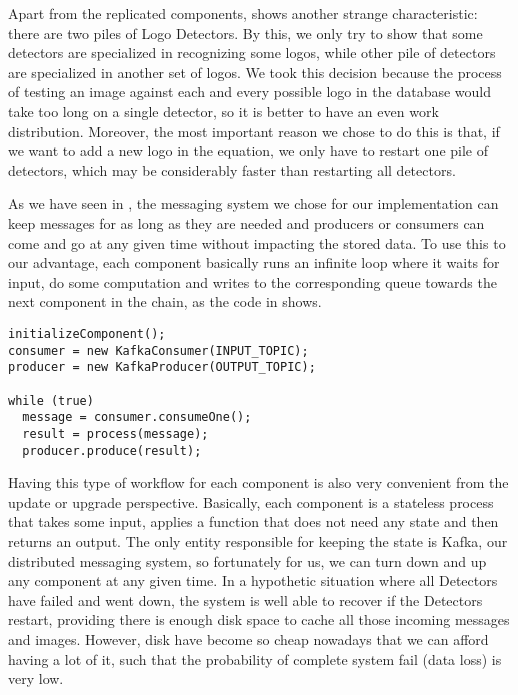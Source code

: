 Apart from the replicated components, 
shows another strange characteristic: there are two piles of Logo Detectors.
By this, we only try to show that some detectors are specialized in recognizing
some logos, while other pile of detectors are specialized in another set of
logos. We took this decision because the process of testing an image against
each and every possible logo in the database would take too long on a single
detector, so it is better to have an even work distribution. Moreover, the most
important reason we chose to do this is that, if we want to add a new logo in
the equation, we only have to restart one pile of detectors, which may be
considerably faster than restarting all detectors.

As we have seen in , the messaging
system we chose for our implementation can keep messages for as long as they
are needed and producers or consumers can come and go at any given time
without impacting the stored data. To use this to our advantage, each
component basically runs an infinite loop where it waits for input, do some
computation and writes to the corresponding queue towards the next component
in the chain, as the code in  shows.

\lstset{caption=General Component Workflow,label=lst:comp-workflow}
\begin{lstlisting}
initializeComponent();
consumer = new KafkaConsumer(INPUT_TOPIC);
producer = new KafkaProducer(OUTPUT_TOPIC);

while (true)
  message = consumer.consumeOne();
  result = process(message);
  producer.produce(result);
\end{lstlisting}

Having this type of workflow for each component is also very convenient from
the update or upgrade perspective. Basically, each component is a
stateless process that takes some input, applies a function that does
not need any state and then returns an output. The only entity responsible for
keeping the state is Kafka, our distributed messaging system, so fortunately
for us, we can turn down and up any component at any given time. In a
hypothetic situation where all Detectors have failed and went down, the system
is well able to recover if the Detectors restart, providing there is enough disk space
to cache all those incoming messages and images. However, disk have become so
cheap nowadays that we can afford having a lot of it, such that the probability of
complete system fail (data loss) is very low.

